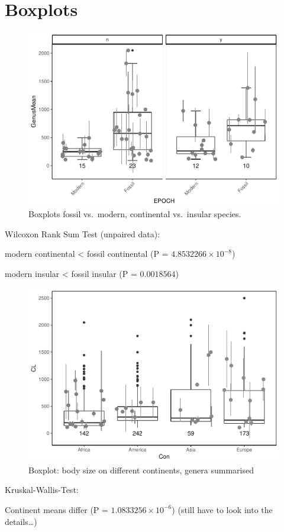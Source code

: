 \section{Boxplots}


\begin{figure}[htbp]
	\centering
	\includegraphics{MA_JJ_files/figure-latex/BPFMCI-1.pdf}
	\caption{Boxplots fossil vs.~modern, continental vs.~insular species.}
\end{figure}


Wilcoxon Rank Sum Test (unpaired data):

modern continental \textless{} fossil continental (P =
\(4.8532266\times 10^{-8}\))

modern insular \textless{} fossil insular (P = \(0.0018564\))




\begin{figure}[htbp]
	\centering
	\includegraphics{MA_JJ_files/figure-latex/BPCon-1.pdf}
	\caption{Boxplot: body size on different continents, genera summarised}
\end{figure}


Kruskal-Wallis-Test:

Continent means differ (P = \(1.0833256\times 10^{-6}\)) (still have to
look into the details\ldots{})